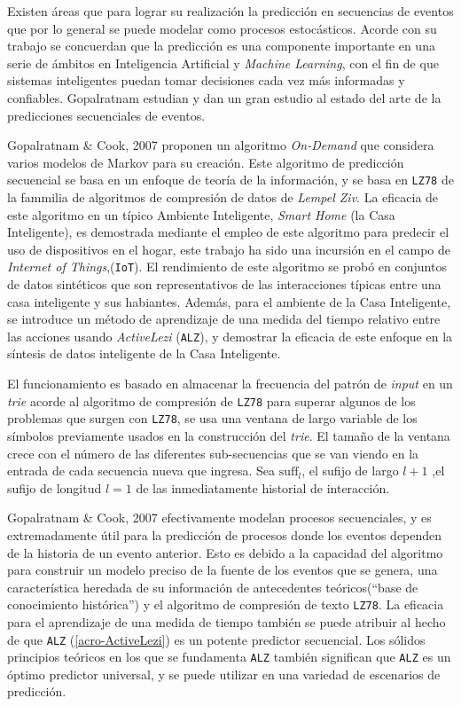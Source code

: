 Existen áreas que para lograr su realización la predicción en secuencias de eventos que por lo general se puede modelar como procesos estocásticos.
Acorde con su trabajo se concuerdan que la predicción es una componente importante en una serie de ámbitos en Inteligencia Artificial y \emph{Machine Learning}, con el fin de que sistemas inteligentes puedan tomar decisiones cada vez más informadas y confiables.  Gopalratnam \etal\cite{Gopalratnam2007} estudian y dan un gran estudio al estado del arte de la predicciones secuenciales de eventos.

Gopalratnam \& Cook, 2007 \etal\cite{Gopalratnam2007} proponen un algoritmo \emph{On-Demand} que considera varios modelos de Markov para su creación.  Este algoritmo de predicción secuencial se basa en un enfoque de teoría de la información, y se basa en \texttt{LZ78} de la fammilia de algoritmos de compresión de datos de \emph{Lempel Ziv}. La eficacia de este algoritmo en un típico {Ambiente Inteligente}, \emph{Smart Home} (la Casa Inteligente), es demostrada mediante el empleo de este algoritmo para predecir el uso de dispositivos en el hogar, este trabajo ha sido una incursión en el campo de \emph{Internet of Things},(\texttt{IoT}). El rendimiento de este algoritmo se probó en conjuntos de datos sintéticos que son representativos de las interacciones típicas entre una casa inteligente y sus habiantes. Además, para el ambiente de la Casa Inteligente, se introduce un método de aprendizaje de una medida del tiempo relativo entre las acciones usando \emph{ActiveLezi} (\texttt{ALZ})\label{acro-ActiveLezi}, y demostrar la eficacia de este enfoque en la síntesis de datos inteligente de la Casa Inteligente.

El funcionamiento es basado en almacenar la frecuencia del patrón de \emph{input} en un \emph{trie} acorde al algoritmo de compresión de \texttt{LZ78} para superar algunos de los problemas que surgen con \texttt{LZ78}, se usa una ventana de largo variable de los símbolos previamente usados en la construcción del \emph{trie}. El tamaño de la ventana crece con el número de las diferentes sub-secuencias que se van viendo en la entrada de cada secuencia nueva que ingresa.  Sea ${\mbox{suff}}_{l}$,  el sufijo de largo $l+1$ ,el sufijo de longitud $l=1$ de las inmediatamente historial de interacción.%

Gopalratnam \& Cook, 2007 \etal\cite{Gopalratnam2007} efectivamente modelan procesos secuenciales, y es extremadamente útil para la predicción de procesos donde los eventos dependen de la historia de un evento anterior. Esto es debido a la capacidad del algoritmo para construir un modelo preciso de la fuente de los eventos que se genera, una característica heredada de su información de antecedentes teóricos(``base de conocimiento histórica'') y el algoritmo de compresión de texto \texttt{LZ78}. La eficacia para el aprendizaje de una medida de tiempo también se puede atribuir al hecho de que \texttt{ALZ} (\ref{acro-ActiveLezi}) es un potente predictor secuencial. Los sólidos principios teóricos en los que se fundamenta \texttt{ALZ} también significan que \texttt{ALZ} es un óptimo predictor universal, y se puede utilizar en una variedad de escenarios de predicción.
	
  	
  	  